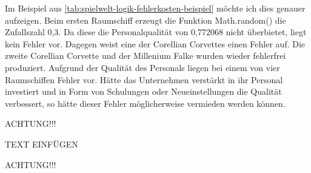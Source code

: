 Im Beispiel aus \ref{tab:spielwelt-logik-fehlerkosten-beispiel} möchte ich dies genauer aufzeigen.
Beim ersten Raumschiff erzeugt die Funktion Math.random() die Zufallszahl 0,3. Da diese die Personalqualität
von 0,772068 nicht überbietet, liegt kein Fehler vor. Dagegen weist eine der Corellian Corvettes einen Fehler auf.
Die zweite Corellian Corvette und der Millenium Falke wurden wieder fehlerfrei produziert.
Aufgrund der Qualität des Personals liegen bei einem von vier Raumschiffen Fehler vor. Hätte das Unternehmen
verstärkt in ihr Personal investiert und in Form von Schulungen oder Neueinstellungen die Qualität verbessert,
so hätte dieser Fehler möglicherweise vermieden werden können.

ACHTUNG!!!

TEXT EINFÜGEN

ACHTUNG!!!